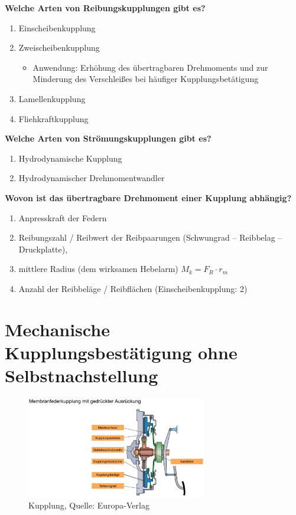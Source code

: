 \textbf{Welche Arten von Reibungskupplungen gibt es?}

\begin{enumerate}
\item
  Einscheibenkupplung
\item
  Zweischeibenkupplung

  \begin{itemize}
  \item
    Anwendung: Erhöhung des übertragbaren Drehmoments und zur Minderung
    des Verschleißes bei häufiger Kupplungsbetätigung
  \end{itemize}
\item
  Lamellenkupplung
\item
  Fliehkraftkupplung
\end{enumerate}

\textbf{Welche Arten von Strömungskupplungen gibt es?}

\begin{enumerate}
\item
  Hydrodynamische Kupplung
\item
  Hydrodynamischer Drehmomentwandler
\end{enumerate}

\textbf{Wovon ist das übertragbare Drehmoment einer Kupplung abhängig?}

\begin{enumerate}
\item
  Anpresskraft der Federn
\item
  Reibungszahl / Reibwert der Reibpaarungen (Schwungrad -- Reibbelag --
  Druckplatte),
\item
  mittlere Radius (dem wirksamen Hebelarm) $M_k = F_R \cdot r_m$
\item
  Anzahl der Reibbeläge / Reibflächen (Einscheibenkupplung: 2)
\end{enumerate}

\section{Mechanische Kupplungsbestätigung ohne
Selbstnachstellung}\label{mechanische-kupplungsbestaetigung-ohne-selbstnachstellung}

\begin{figure}[!ht]%
\centering
\includegraphics[width=0.7\textwidth]{images/Kupplung/Kupplung-8.pdf}
\caption{Kupplung, Quelle: Europa-Verlag}
\end{figure}

